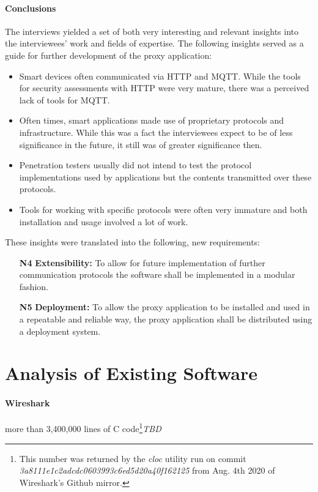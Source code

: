 \paragraph{Conclusions} %
The interviews yielded a set of both very interesting and relevant insights into the interviewees' work and fields of expertise. The following insights served as a guide for further development of the proxy application:
\begin{itemize}
    \item Smart devices often communicated via \ac{HTTP} and \ac{MQTT}. While the tools for security assessments with \ac{HTTP} were very mature, there was a perceived lack of tools for \ac{MQTT}.
    \item Often times, smart applications made use of proprietary protocols and infrastructure. While this was a fact the interviewees expect to be of less significance in the future, it still was of greater significance then.
    \item Penetration testers usually did not intend to test the protocol implementations used by applications but the contents transmitted over these protocols.
    \item Tools for working with specific protocols were often very immature and both installation and usage involved a lot of work.
\end{itemize}
These insights were translated into the following, new requirements:
\begin{itemize}
    \item [\textbf{N4}] \textbf{Extensibility:} To allow for future implementation of further communication protocols the software shall be implemented in a modular fashion.
    \item [\textbf{N5}] \textbf{Deployment:} To allow the proxy application to be installed and used in a repeatable and reliable way, the proxy application shall be distributed using a deployment system.
\end{itemize}


\section{Analysis of Existing Software}
\paragraph{Wireshark} more than 3,400,000 lines of C code\footnote{This number was returned by the \emph{cloc} utility run on commit \emph{3a8111e1c2adcdc0603993c6ed5d20a40f162125} from Aug. 4th 2020 of Wireshark's Github mirror.}\emph{TBD}
